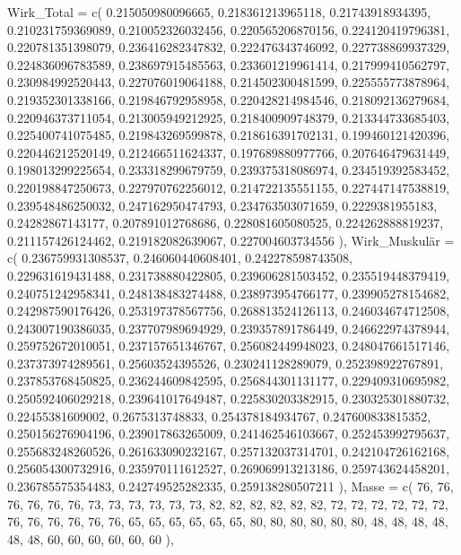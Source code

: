\documentclass[
  letterpaper,
  DIV=11]{scrartcl}
\newenvironment{Shaded}{\begin{snugshade}}{\end{snugshade}}
\newcommand{\NormalTok}[1]{\textcolor[rgb]{0.00,0.23,0.31}{#1}}
\begin{document}
\begin{Shaded}
\begin{Highlighting}[]
\NormalTok{  \textasciigrave{}Wirk\_Total\textasciigrave{} = c( 0.215050980096665, 0.218361213965118, 0.21743918934395, 0.210231759369089, 0.210052326032456, 0.220565206870156, 0.224120419796381, 0.220781351398079, 0.236416282347832, 0.222476343746092, 0.227738869937329, 0.224836096783589, 0.238697915485563, 0.233601219961414, 0.217999410562797, 0.230984992520443, 0.227076019064188, 0.214502300481599, 0.225555773878964, 0.219352301338166, 0.219846792958958, 0.220428214984546, 0.218092136279684, 0.220946373711054, 0.213005949212925, 0.218400909748379, 0.213344733685403, 0.225400741075485, 0.219843269599878, 0.218616391702131, 0.199460121420396, 0.220446212520149, 0.212466511624337, 0.197689880977766, 0.207646479631449, 0.198013299225654, 0.233318299679759, 0.239375318086974, 0.234519392583452, 0.220198847250673, 0.227970762256012, 0.214722135551155, 0.227447147538819, 0.239548486250032, 0.247162950474793, 0.234763503071659, 0.2229381955183, 0.24282867143177, 0.207891012768686, 0.228081605080525, 0.224262888819237, 0.211157426124462, 0.219182082639067, 0.227004603734556 ),}
\NormalTok{  \textasciigrave{}Wirk\_Muskulär\textasciigrave{} = c( 0.236759931308537, 0.246060440608401, 0.242278598743508, 0.229631619431488, 0.231738880422805, 0.239606281503452, 0.235519448379419, 0.240751242958341, 0.248138483274488, 0.238973954766177, 0.239905278154682, 0.242987590176426, 0.253197378567756, 0.268813524126113, 0.246034674712508, 0.243007190386035, 0.237707989694929, 0.239357891786449, 0.246622974378944, 0.259752672010051, 0.237157651346767, 0.256082449948023, 0.248047661517146, 0.237373974289561, 0.25603524395526, 0.230241128289079, 0.252398922767891, 0.237853768450825, 0.236244609842595, 0.256844301131177, 0.229409310695982, 0.250592406029218, 0.239641017649487, 0.225830203382915, 0.230325301880732, 0.22455381609002, 0.2675313748833, 0.254378184934767, 0.247600833815352, 0.250156276904196, 0.239017863265009, 0.241462546103667, 0.252453992795637, 0.255683248260526, 0.261633090232167, 0.257132037314701, 0.242104726162168, 0.256054300732916, 0.235970111612527, 0.269069913213186, 0.259743624458201, 0.236785575354483, 0.242749525282335, 0.259138280507211 ),}
\NormalTok{  \textasciigrave{}Masse\textasciigrave{} = c( 76, 76, 76, 76, 76, 76, 73, 73, 73, 73, 73, 73, 82, 82, 82, 82, 82, 82, 72, 72, 72, 72, 72, 72, 76, 76, 76, 76, 76, 76, 65, 65, 65, 65, 65, 65, 80, 80, 80, 80, 80, 80, 48, 48, 48, 48, 48, 48, 60, 60, 60, 60, 60, 60 ),}

\end{Highlighting}
\end{Shaded}
\end{document}
